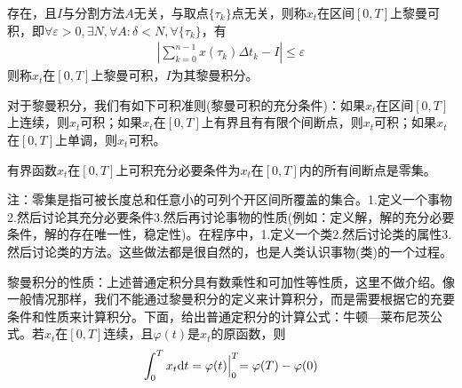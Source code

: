             存在，且$I$与分割方法$A$无关，与取点$\{\tau_k\}$点无关，则称$x_t$在区间$[0,T]$上黎曼可积，即$\forall \varepsilon >0 , \exists N,\forall A:\delta<N,\forall \{\tau_k\}$，有
            \begin{align*}
                \left|\sum_{k = 0}^{n -1} x(\tau_k)\Delta t_k - I\right| \leqslant \varepsilon
            \end{align*}
            则称$x_t$在$[0,T]$上黎曼可积，$I$为其黎曼积分。
            \par
            对于黎曼积分，我们有如下可积准则(黎曼可积的充分条件)：如果$x_t$在区间$[0,T]$上连续，则$x_t$可积；如果$x_t$在$[0,T]$上有界且有有限个间断点，则$x_t$可积；如果$x_t$在$[0,T]$上单调，则$x_t$可积。
            \begin{theorem}
            有界函数$x_t$在$[0,T]$上可积充分必要条件为$x_t$在$[0,T]$内的所有间断点是零集。
            \end{theorem}
            注：零集是指可被长度总和任意小的可列个开区间所覆盖的集合。1.定义一个事物2.然后讨论其充分必要条件3.然后再讨论事物的性质(例如：定义解，解的充分必要条件，解的存在唯一性，稳定性)。在程序中，1.定义一个类2.然后讨论类的属性3.然后讨论类的方法。这些做法都是很自然的，也是人类认识事物(类)的一个过程。
            \par
            黎曼积分的性质：上述普通定积分具有数乘性和可加性等性质，这里不做介绍。像一般情况那样，我们不能通过黎曼积分的定义来计算积分，而是需要根据它的充要条件和性质来计算积分。下面，给出普通定积分的计算公式：牛顿—莱布尼茨公式。若$x_t$在$[0,T]$连续，且$\varphi(t) $是$x_t$的原函数，则
            \begin{align*}
                \int_0^T x_t \mathrm{d}t = \varphi(t) \Bigl|_0^T = \varphi(T) - \varphi(0)
            \end{align*}

